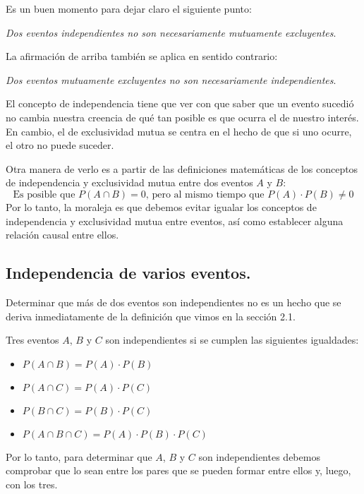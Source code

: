 \documentclass[12pt]{article}
\begin{document}
Es un buen momento para dejar claro el siguiente punto:

\begin{center}
\textit{Dos eventos independientes no son necesariamente mutuamente excluyentes}.
\end{center}

La afirmación de arriba también se aplica en sentido contrario:

\begin{center}
\textit{Dos eventos mutuamente excluyentes no son necesariamente independientes}.
\end{center}

El concepto de independencia tiene que ver con que saber que un evento sucedió no cambia nuestra creencia de qué tan posible es que ocurra el de nuestro interés. En cambio, el de exclusividad mutua se centra en el hecho de que si uno ocurre, el otro no puede suceder.

Otra manera de verlo es a partir de las definiciones matemáticas de los conceptos de independencia y exclusividad mutua entre dos eventos $A$ y $B$:
\[
  \text{Es posible que } P(A \cap B) = 0 \text{, pero al mismo tiempo que } P(A) \cdot P(B) \neq 0
\]
Por lo tanto, la moraleja es que debemos evitar igualar los conceptos de independencia y exclusividad mutua entre eventos, así como establecer alguna relación causal entre ellos.

\subsection{Independencia de varios eventos.}

Determinar que más de dos eventos son independientes no es un hecho que se deriva inmediatamente de la definición que vimos en la sección 2.1.

Tres eventos $A$, $B$ y $C$ son independientes si se cumplen las siguientes igualdades:

\begin{itemize}
\item $P(A \cap B) = P(A) \cdot P(B)$
\item $P(A \cap C) = P(A) \cdot P(C)$
\item $P(B \cap C) = P(B) \cdot P(C)$
\item $P(A \cap B \cap C) = P(A) \cdot P(B) \cdot P(C)$
\end{itemize}

Por lo tanto, para determinar que $A$, $B$ y $C$ son independientes debemos comprobar que lo sean entre los pares que se pueden formar entre ellos y, luego, con los tres.
\end{document}
